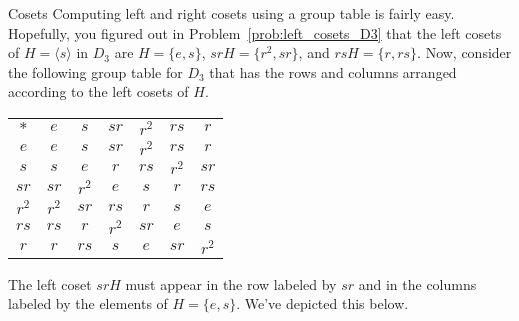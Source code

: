 \begin{section}{Cosets}
Computing left and right cosets using a group table is fairly easy.  Hopefully, you figured out in Problem~\ref{prob:left_cosets_D3} that the left cosets of $H=\langle s\rangle$ in $D_3$ are $H=\{e,s\}$, $srH=\{r^2,sr\}$, and $rsH=\{r,rs\}$.  Now, consider the following group table for $D_3$ that has the rows and columns arranged according to the left cosets of $H$.

\begin{center}
\begin{tabular}{c!{\vrule width 2pt}c|c|c|c|c|c}
$*$ & $e$ & $s$ & $sr$ & $r^2$ & $rs$ & $r$ \\ 
$e$ & $e$ & $s$ & $sr$ & $r^2$ & $rs$ & $r$\\
\hline $s$ & $s$ & $e$ & $r$ & $rs$ & $r^2$ & $sr$ \\
\hline $sr$ & $sr$ & $r^2$ & $e$ & $s$ & $r$ & $rs$\\
\hline $r^2$ & $r^2$ & $sr$ & $rs$ & $r$ & $s$ & $e$\\
\hline $rs$ & $rs$ & $r$ & $r^2$ & $sr$ & $e$ & $s$\\
\hline $r$ & $r$ & $rs$ & $s$ & $e$ & $sr$ & $r^2$\\
\end{tabular}
\end{center}
The left coset $srH$ must appear in the row labeled by $sr$ and in the columns labeled by the elements of $H=\{e,s\}$.  We've depicted this below.


\end{section}
